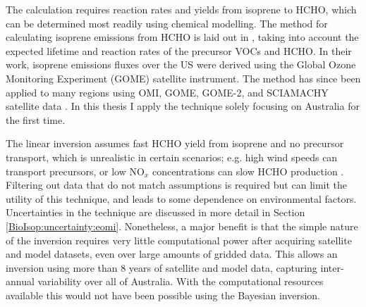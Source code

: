       The calculation requires reaction rates and yields from isoprene to HCHO, which can be determined most readily using chemical modelling.
      The method for calculating isoprene emissions from HCHO is laid out in \textcite{Palmer2003}, taking into account the expected lifetime and reaction rates of the precursor VOCs and HCHO.
      In their work, isoprene emissions fluxes over the US were derived using the Global Ozone Monitoring Experiment (GOME) satellite instrument.
      The method has since been applied to many regions using OMI, GOME, GOME-2, and SCIAMACHY satellite data \parencite[e.g.][]{Abbot2003, Barkley2013, Stavrakou2014, Surl2018}.
      In this thesis I apply the technique solely focusing on Australia for the first time.
      
      
      
      The linear inversion assumes fast HCHO yield from isoprene and no precursor transport, which is unrealistic in certain scenarios; e.g. high wind speeds can transport precursors, or low NO$_x$ concentrations can slow HCHO production \parencite{Palmer2006,Surl2018}.
      Filtering out data that do not match assumptions is required but can limit the utility of this technique, and leads to some dependence on environmental factors.
      Uncertainties in the technique are discussed in more detail in Section \ref{BioIsop:uncertainty:eomi}.
      Nonetheless, a major benefit is that the simple nature of the inversion requires very little computational power after acquiring satellite and model datasets, even over large amounts of gridded data.
      This allows an inversion using more than 8 years of satellite and model data, capturing inter-annual variability over all of Australia.
      With the computational resources available this would not have been possible using the Bayesian inversion.

